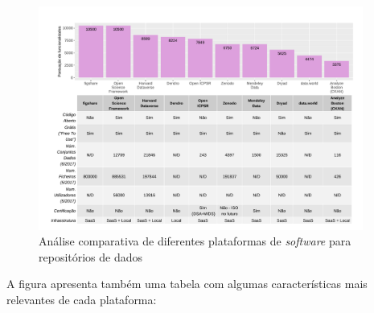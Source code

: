 \documentclass[sigconf,nonacm]{acmart}
\begin{document}
\begin{figure}[h!t!]
\centering
\includegraphics[width=0.95\textwidth]{Sources/DataverseComparativeReview/plot.pdf}
\caption{Análise comparativa de diferentes plataformas de \emph{software} para repositórios de dados}
\end{figure}

A figura apresenta também uma tabela com algumas características mais relevantes de cada plataforma:
\end{document}
